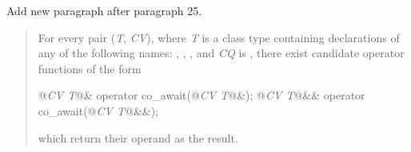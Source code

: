 Add new paragraph after paragraph 25.

\begin{quote}
\setcounter{Paras}{25}
\pnum
For every pair
(\textit{T},
\textit{CV}),
where
\textit{T}
is a class type containing declarations of any of the following names: , , , and
\textit{CQ}
is , there exist candidate operator functions of the form
\begin{codeblock}
  @\textit{CV T}@& operator co_await(@\textit{CV T}@&);
  @\textit{CV T}@&& operator co_await(@\textit{CV T}@&&);
\end{codeblock}
which return their operand as the result.
\end{quote}

%

%
%
%
%

%

